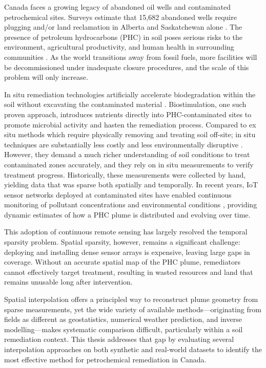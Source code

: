 \label{chapter:introduction}

Canada faces a growing legacy of abandoned oil wells and contaminated petrochemical sites. Surveys estimate that 15,682 abandoned wells require plugging and/or land reclamation in Alberta and Saskatchewan alone \cite{est_cost_of_cleaning_canada}. The presence of petroleum hydrocarbons (PHC) in soil poses serious risks to the environment, agricultural productivity, and human health in surrounding communities \cite{PHCBadForCrops,PHCBadForHumans,PHCBadForEnv}. As the world transitions away from fossil fuels, more facilities will be decommissioned under inadequate closure procedures, and the scale of this problem will only increase.

In situ remediation technologies artificially accelerate biodegradation within the soil without excavating the contaminated material \cite{remTechReview}. Biostimulation, one such proven approach, introduces nutrients directly into PHC-contaminated sites to promote microbial activity and hasten the remediation process. Compared to ex situ methods which require physically removing and treating soil off-site; in situ techniques are substantially less costly and less environmentally disruptive \cite{LioraTech}. However, they demand a much richer understanding of soil conditions to treat contaminated zones accurately, and they rely on in situ measurements to verify treatment progress. Historically, these measurements were collected by hand, yielding data that was sparse both spatially and temporally. In recent years, IoT sensor networks deployed at contaminated sites have enabled continuous monitoring of pollutant concentrations and environmental conditions \cite{LioraRemoteSensing,atmMeasInSoil}, providing dynamic estimates of how a PHC plume is distributed and evolving over time.

This adoption of continuous remote sensing has largely resolved the temporal sparsity problem. Spatial sparsity, however, remains a significant challenge: deploying and installing dense sensor arrays is expensive, leaving large gaps in coverage. Without an accurate spatial map of the PHC plume, remediators cannot effectively target treatment, resulting in wasted resources and land that remains unusable long after intervention.

Spatial interpolation offers a principled way to reconstruct plume geometry from sparse measurements, yet the wide variety of available methods---originating from fields as different as geostatistics, numerical weather prediction, and inverse modelling---makes systematic comparison difficult, particularly within a soil remediation context. This thesis addresses that gap by evaluating several interpolation approaches on both synthetic and real-world datasets to identify the most effective method for petrochemical remediation in Canada.

